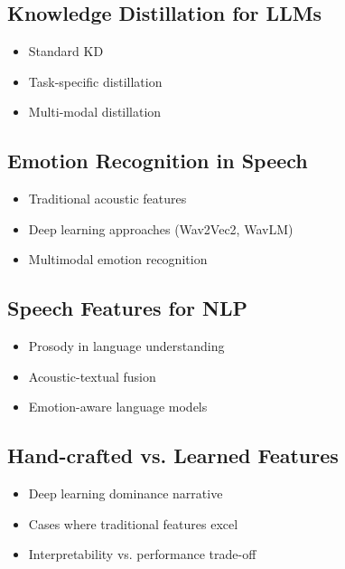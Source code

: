 
\subsection{Knowledge Distillation for LLMs}
\begin{itemize}
    \item Standard KD \cite{hinton2015distilling}
    \item Task-specific distillation \cite{TODO}
    \item Multi-modal distillation \cite{TODO}
\end{itemize}

\subsection{Emotion Recognition in Speech}
\begin{itemize}
    \item Traditional acoustic features \cite{TODO}
    \item Deep learning approaches (Wav2Vec2, WavLM) \cite{TODO}
    \item Multimodal emotion recognition \cite{TODO}
\end{itemize}

\subsection{Speech Features for NLP}
\begin{itemize}
    \item Prosody in language understanding \cite{TODO}
    \item Acoustic-textual fusion \cite{TODO}
    \item Emotion-aware language models \cite{TODO}
\end{itemize}

\subsection{Hand-crafted vs. Learned Features}
\begin{itemize}
    \item Deep learning dominance narrative
    \item Cases where traditional features excel
    \item Interpretability vs. performance trade-off
\end{itemize}

